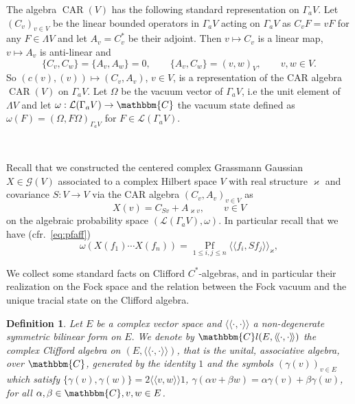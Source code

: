 \documentclass[11pt]{article}
\newcommand{\cdummy}{\cdot}
\newcommand{\llangle}{{\langle\!\langle}}
\newcommand{\rrangle}{{\rangle\!\rangle}}
\newcommand{\tmop}[1]{\ensuremath{\operatorname{#1}}}
\newtheorem{definition}{Definition}
\begin{document}
The algebra $\tmop{CAR} (V)$ has the following standard representation on
$\Gamma_a V$. Let $(C_v)_{v \in V}$ be the linear bounded operators in
$\Gamma_a V$ acting on $\Gamma_a V$ as $C_v F = v F$ for any $F \in \Lambda V$
and let $A_v = C_v^{\ast}$ be their adjoint. Then $v \mapsto C_v$ is a linear
map, $v \mapsto A_v$ is anti-linear and
\[ \{ C_v, C_w \} = \{ A_v, A_w \} = 0, \qquad \{ A_v, C_w \} = (v, w)_V,
   \qquad v, w \in V. \]
So $(c (v), (v)) \mapsto (C_v, A_v)$, $v \in V$, is a representation of the
CAR algebra $\tmop{CAR} (V)$ on $\Gamma_a V$. Let $\Omega$ be the vacuum
vector of $\Gamma_a V$, i.e the unit element of $\Lambda V$ and let $\omega :
\mathcal{L} (\Gamma_a V) \rightarrow \mathbbm{C}$ the vacuum state defined as
$\omega (F) = (\Omega, F \Omega)_{\Gamma_a V}$ for $F \in \mathcal{L}
(\Gamma_a V)$.

\

Recall that we constructed the centered complex Grassmann Gaussian $X \in
\mathcal{G} (V)$ associated to a complex Hilbert space $V$ with real structure
$\varkappa$ and covariance $S : V \rightarrow V$ via the CAR algebra $(C_v,
A_v)_{v \in V}$ as
\[ X (v) = C_{S v} + A_{\varkappa v}, \qquad v \in V \]
on the algebraic probability space $(\mathcal{L} (\Gamma_a V), \omega)$. In
particular recall that we have (cfr.~{\eqref{eq:pfaff}})
\begin{equation}
  \omega (X (f_1) \cdots X (f_n)) = \underset{1 \leqslant i, j \leqslant
  n}{\tmop{Pf}} \llangle f_i, S f_j \rrangle_{\varkappa},
  \label{eq:complex-gauss-GP}
\end{equation}


We collect some standard facts on Clifford $C^{\ast}$-algebras, and in
particular their realization on the Fock space and the relation between the
Fock vacuum and the unique tracial state on the Clifford algebra.

\begin{definition}
  \label{GPdef:Clifford}Let $E$ be a complex vector space and $\llangle
  \cdummy, \cdummy \rrangle$ a non-degenerate symmetric bilinear form on $E.$
  We denote by $\mathbbm{C}l (E, \llangle \cdummy, \cdummy \rrangle)$ the
  complex Clifford algebra on $(E, \llangle \cdummy, \cdummy \rrangle)$, that
  is the unital, associative algebra, over $\mathbbm{C}$, generated by the
  identity $1$ and the symbols $(\gamma (v))_{v \in E}$ which satisfy $\{
  \gamma (v), \gamma (w) \} = 2 \llangle v, w \rrangle 1$, $\gamma (\alpha v +
  \beta w) = \alpha \gamma (v) + \beta \gamma (w)$, for all $\alpha, \beta \in
  \mathbbm{C}, v, w \in E$.
\end{definition}
\end{document}
